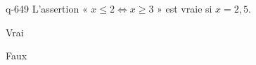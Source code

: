 \begin{truefalse}{q-649}
L'assertion « $x\leq 2 \Leftrightarrow x \geq 3$ » est vraie si $x=2,5$.
\item* Vrai
\item Faux
\end{truefalse}

